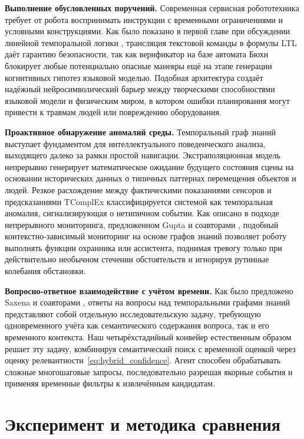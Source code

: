 \textbf{Выполнение обусловленных поручений.} Современная сервисная робототехника требует от робота воспринимать инструкции с временными ограничениями и условными конструкциями. Как было показано в первой главе при обсуждении линейной темпоральной логики \cite{ref29}, трансляция текстовой команды в формулы LTL даёт гарантию безопасности, так как верификатор на базе автомата Бюхи блокирует любые потенциально опасные маневры ещё на этапе генерации когнитивных гипотез языковой моделью. Подобная архитектура создаёт надёжный нейросимволический барьер между творческими способностями языковой модели и физическим миром, в котором ошибки планирования могут привести к травмам людей или повреждению оборудования.

\textbf{Проактивное обнаружение аномалий среды.} Темпоральный граф знаний выступает фундаментом для интеллектуального поведенческого анализа, выходящего далеко за рамки простой навигации. Экстраполяционная модель непрерывно генерирует математическое ожидание будущего состояния сцены на основании исторических данных о типичных паттернах перемещения объектов и людей. Резкое расхождение между фактическими показаниями сенсоров и предсказаниями TComplEx классифицируется системой как темпоральная аномалия, сигнализирующая о нетипичном событии. Как описано в подходе непрерывного мониторинга, предложенном Gupta и соавторами \cite{ref28}, подобный контекстно-зависимый мониторинг на основе графов знаний позволяет роботу выполнять функции охранника или ассистента, поднимая тревогу только при действительно необычном стечении обстоятельств и игнорируя рутинные колебания обстановки.

\textbf{Вопросно-ответное взаимодействие с учётом времени.} Как было предложено Saxena и соавторами \cite{ref50}, ответы на вопросы над темпоральными графами знаний представляют собой отдельную исследовательскую задачу, требующую одновременного учёта как семантического содержания вопроса, так и его временного контекста. Наш четырёхстадийный конвейер естественным образом решает эту задачу, комбинируя семантический поиск с временной оценкой через оценку релевантности~\eqref{eq:hybrid_confidence}. Агент способен обрабатывать сложные многошаговые запросы, последовательно разрешая якорные события и применяя временные фильтры к извлечённым кандидатам.


\section{Эксперимент и методика сравнения}
\label{sec:experiment}

